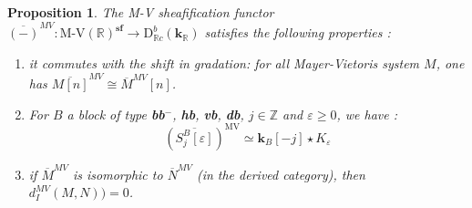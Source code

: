 \documentclass[a4paper, english, 11pt]{article}
\newcommand{\kk}[0]{\textbf{k}}
\newcommand{\0}{\vec{0}}
\newcommand{\R}[0]{\mathbb{R}}
\newcommand{\Z}[0]{\mathbb{Z}}
\newcommand{\D}[0]{\text{D}}
\newcommand{\MV}{\text{MV}}
\newcommand{\s}{\textbf{sf}}
\newtheorem{prop}{Proposition}[section]
\begin{document}
\begin{prop}\label{P:PropertiesofMVSheafification}
The M-V sheafification functor $\overline{(-)}^{MV}: \text{M-V}(\R)^{\s} \to  \D^b_{\R c}(\kk_\R)$ satisfies the following properties : 
\begin{enumerate}
    \item it commutes with the shift in gradation: for all Mayer-Vietoris system $M$, one has $\overline{M[n]}^{MV} \cong \overline{M}^{MV}[n]$. 
    \item For $B$ a block of type \textbf{bb$^-$}, \textbf{hb}, \textbf{vb}, \textbf{db}, $j\in \Z$ and $\varepsilon \geq 0$, we have : $$(\overline{S_j^B [\varepsilon]})^{\MV} \simeq \kk_B[-j] \star K_\varepsilon $$
    \item if $\overline{M}^{MV}$ is isomorphic to  $\overline{N}^{MV}$ (in the derived category), then $d_I^{MV}(M, N)) =0$.
 \end{enumerate}
\end{prop}
\end{document}
